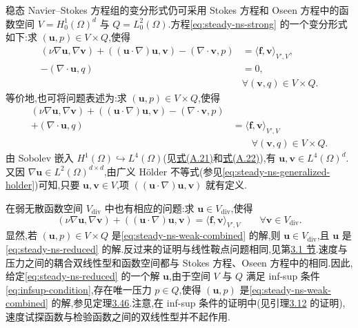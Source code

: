\begin{note}\label{note:steady-ns-variational-form}
稳态 Navier--Stokes 方程组的变分形式仍可采用 Stokes 方程和 Oseen 方程中的函数空间 $V=H_0^1(\Omega)^d$ 与 $Q=L_0^2(\Omega)$.方程\cref{eq:steady-ns-strong} 的一个变分形式如下:求 $(\bm{u},p)\in V\times Q$,使得
\begin{equation}\label{eq:steady-ns-weak}
\begin{aligned}
  (\nu\nabla\bm{u},\nabla\bm{v})
  +((\bm{u}\cdot\nabla)\bm{u},\bm{v})
  -(\nabla\cdot\bm{v},p)&=\langle\bm{f},\bm{v}\rangle_{V',V},\\
  -(\nabla\cdot\bm{u},q)&=0,\\
  &\forall(\bm{v},q)\in V\times Q.
\end{aligned}
\end{equation}
等价地,也可将问题表述为:求 $(\bm{u},p)\in V\times Q$,使得
\begin{equation}\label{eq:steady-ns-weak-combined}
\begin{aligned}
  (\nu\nabla\bm{u},\nabla\bm{v})
  +((\bm{u}\cdot\nabla)\bm{u},\bm{v})
  -(\nabla\cdot\bm{v},p)&\\
  +(\nabla\cdot\bm{u},q)&=\langle\bm{f},\bm{v}\rangle_{V',V}\\
  &\qquad\forall(\bm{v},q)\in V\times Q.
\end{aligned}
\end{equation}
由 Sobolev 嵌入 $H^1(\Omega)\hookrightarrow L^4(\Omega)$(见\hyperref[eq:appendix-a-21]{式(A.21)}和\hyperref[eq:appendix-a-22]{式(A.22)}),有 $\bm{u},\bm{v}\in L^4(\Omega)^d$.又因 $\nabla\bm{u}\in L^2(\Omega)^{d\times d}$,由广义 Hölder 不等式(参见\cref{eq:steady-ns-generalized-holder})可知,只要 $\bm{u},\bm{v}\in V$,项 $((\bm{u}\cdot\nabla)\bm{u},\bm{v})$ 就有定义.
\end{note}

\begin{note}\label{note:steady-ns-reduced-problem}
在弱无散函数空间 $V_{\mathrm{div}}$ 中也有相应的问题:求 $\bm{u}\in V_{\mathrm{div}}$,使得
\begin{equation}\label{eq:steady-ns-reduced}
  (\nu\nabla\bm{u},\nabla\bm{v})
  +((\bm{u}\cdot\nabla)\bm{u},\bm{v})
  =\langle\bm{f},\bm{v}\rangle_{V',V}
  \qquad\forall\bm{v}\in V_{\mathrm{div}}.
\end{equation}
显然,若 $(\bm{u},p)\in V\times Q$ 是\cref{eq:steady-ns-weak-combined} 的解,则 $\bm{u}\in V_{\mathrm{div}}$,且 $\bm{u}$ 是\cref{eq:steady-ns-reduced} 的解.反过来的证明与线性鞍点问题相同,见第\hyperref[sec:abstract-saddle-point]{3.1 节}.速度与压力之间的耦合双线性型和函数空间都与 Stokes 方程、Oseen 方程中的相同.因此,给定\cref{eq:steady-ns-reduced} 的一个解 $\bm{u}$,由于空间 $V$ 与 $Q$ 满足 inf-sup 条件\cref{eq:infsup-condition},存在唯一压力 $p\in Q$,使得 $(\bm{u},p)$ 是\cref{eq:steady-ns-weak-combined} 的解,参见定理\hyperref[thm:infsup-v-q]{3.46}.注意,在 inf-sup 条件的证明中(见引理\hyperref[lem:inf-sup-condition]{3.12} 的证明),速度试探函数与检验函数之间的双线性型并不起作用.
\end{note}

